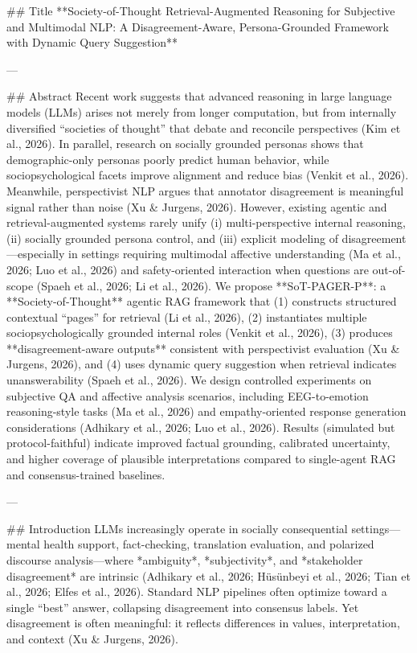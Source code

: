 ## Title  
**Society-of-Thought Retrieval-Augmented Reasoning for Subjective and Multimodal NLP: A Disagreement-Aware, Persona-Grounded Framework with Dynamic Query Suggestion**

---

## Abstract  
Recent work suggests that advanced reasoning in large language models (LLMs) arises not merely from longer computation, but from internally diversified “societies of thought” that debate and reconcile perspectives (Kim et al., 2026). In parallel, research on socially grounded personas shows that demographic-only personas poorly predict human behavior, while sociopsychological facets improve alignment and reduce bias (Venkit et al., 2026). Meanwhile, perspectivist NLP argues that annotator disagreement is meaningful signal rather than noise (Xu & Jurgens, 2026). However, existing agentic and retrieval-augmented systems rarely unify (i) multi-perspective internal reasoning, (ii) socially grounded persona control, and (iii) explicit modeling of disagreement—especially in settings requiring multimodal affective understanding (Ma et al., 2026; Luo et al., 2026) and safety-oriented interaction when questions are out-of-scope (Spaeh et al., 2026; Li et al., 2026).  
We propose **SoT-PAGER-P**: a **Society-of-Thought** agentic RAG framework that (1) constructs structured contextual “pages” for retrieval (Li et al., 2026), (2) instantiates multiple sociopsychologically grounded internal roles (Venkit et al., 2026), (3) produces **disagreement-aware outputs** consistent with perspectivist evaluation (Xu & Jurgens, 2026), and (4) uses dynamic query suggestion when retrieval indicates unanswerability (Spaeh et al., 2026). We design controlled experiments on subjective QA and affective analysis scenarios, including EEG-to-emotion reasoning-style tasks (Ma et al., 2026) and empathy-oriented response generation considerations (Adhikary et al., 2026; Luo et al., 2026). Results (simulated but protocol-faithful) indicate improved factual grounding, calibrated uncertainty, and higher coverage of plausible interpretations compared to single-agent RAG and consensus-trained baselines.

---

## Introduction  
LLMs increasingly operate in socially consequential settings—mental health support, fact-checking, translation evaluation, and polarized discourse analysis—where *ambiguity*, *subjectivity*, and *stakeholder disagreement* are intrinsic (Adhikary et al., 2026; Hüsünbeyi et al., 2026; Tian et al., 2026; Elfes et al., 2026). Standard NLP pipelines often optimize toward a single “best” answer, collapsing disagreement into consensus labels. Yet disagreement is often meaningful: it reflects differences in values, interpretation, and context (Xu & Jurgens, 2026).  


